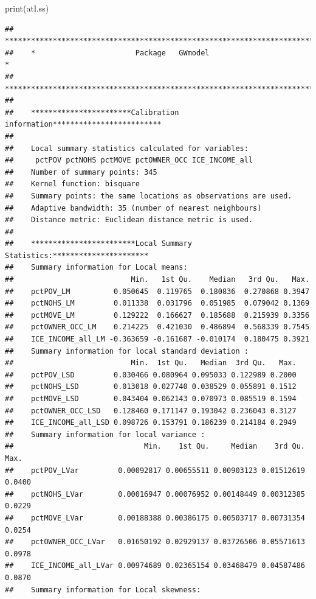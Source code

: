 \documentclass[
]{book}
\newenvironment{Shaded}{\begin{snugshade}}{\end{snugshade}}
\newcommand{\FunctionTok}[1]{\textcolor[rgb]{0.00,0.00,0.00}{#1}}
\newcommand{\NormalTok}[1]{#1}
\begin{document}
\begin{Shaded}
\begin{Highlighting}[]
\FunctionTok{print}\NormalTok{(atl.ss)}
\end{Highlighting}
\end{Shaded}

\begin{verbatim}
##    ***********************************************************************
##    *                       Package   GWmodel                             *
##    ***********************************************************************
## 
##    ***********************Calibration information*************************
## 
##    Local summary statistics calculated for variables:
##     pctPOV pctNOHS pctMOVE pctOWNER_OCC ICE_INCOME_all
##    Number of summary points: 345
##    Kernel function: bisquare 
##    Summary points: the same locations as observations are used.
##    Adaptive bandwidth: 35 (number of nearest neighbours)
##    Distance metric: Euclidean distance metric is used.
## 
##    ************************Local Summary Statistics:**********************
##    Summary information for Local means:
##                           Min.   1st Qu.    Median   3rd Qu.   Max.
##    pctPOV_LM          0.050645  0.119765  0.180836  0.270868 0.3947
##    pctNOHS_LM         0.011338  0.031796  0.051985  0.079042 0.1369
##    pctMOVE_LM         0.129222  0.166627  0.185688  0.215939 0.3356
##    pctOWNER_OCC_LM    0.214225  0.421030  0.486894  0.568339 0.7545
##    ICE_INCOME_all_LM -0.363659 -0.161687 -0.010174  0.180475 0.3921
##    Summary information for local standard deviation :
##                           Min.  1st Qu.   Median  3rd Qu.   Max.
##    pctPOV_LSD         0.030466 0.080964 0.095033 0.122989 0.2000
##    pctNOHS_LSD        0.013018 0.027740 0.038529 0.055891 0.1512
##    pctMOVE_LSD        0.043404 0.062143 0.070973 0.085519 0.1594
##    pctOWNER_OCC_LSD   0.128460 0.171147 0.193042 0.236043 0.3127
##    ICE_INCOME_all_LSD 0.098726 0.153791 0.186239 0.214184 0.2949
##    Summary information for local variance :
##                              Min.    1st Qu.     Median    3rd Qu.   Max.
##    pctPOV_LVar         0.00092817 0.00655511 0.00903123 0.01512619 0.0400
##    pctNOHS_LVar        0.00016947 0.00076952 0.00148449 0.00312385 0.0229
##    pctMOVE_LVar        0.00188388 0.00386175 0.00503717 0.00731354 0.0254
##    pctOWNER_OCC_LVar   0.01650192 0.02929137 0.03726506 0.05571613 0.0978
##    ICE_INCOME_all_LVar 0.00974689 0.02365154 0.03468479 0.04587486 0.0870
##    Summary information for Local skewness:

\end{verbatim}
\end{document}
